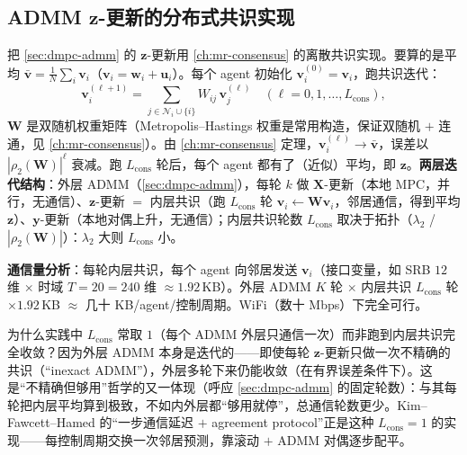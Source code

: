 \subsection{ADMM $\mathbf{z}$-更新的分布式共识实现}
\label{sec:dmpc-z-consensus}

把 \cref{sec:dmpc-admm} 的 $\mathbf{z}$-更新用 \cref{ch:mr-consensus} 的离散共识实现。要算的是平均 $\bar{\mathbf{v}}=\tfrac1N\sum_i\mathbf{v}_i$（$\mathbf{v}_i=\mathbf{w}_i+\mathbf{u}_i$）。每个 agent 初始化 $\mathbf{v}_i^{(0)}=\mathbf{v}_i$，跑共识迭代：
\begin{equation}
  \mathbf{v}_i^{(\ell+1)}=\sum_{j\in\mathcal{N}_i\cup\{i\}}W_{ij}\,\mathbf{v}_j^{(\ell)}\quad(\ell=0,1,\dots,L_{\text{cons}}),
  \label{eq:dmpc-inner-consensus}
\end{equation}
$\mathbf{W}$ 是双随机权重矩阵（Metropolis--Hastings 权重是常用构造，保证双随机 $+$ 连通，见 \cref{ch:mr-consensus}）。由 \cref{ch:mr-consensus} 定理，$\mathbf{v}_i^{(\ell)}\to\bar{\mathbf{v}}$，误差以 $|\rho_2(\mathbf{W})|^\ell$ 衰减。跑 $L_{\text{cons}}$ 轮后，每个 agent 都有了（近似）平均，即 $\mathbf{z}$。\textbf{两层迭代结构}：外层 ADMM（\cref{sec:dmpc-admm}），每轮 $k$ 做 $\mathbf{X}$-更新（本地 MPC，并行，无通信）、$\mathbf{z}$-更新 $=$ 内层共识（跑 $L_{\text{cons}}$ 轮 $\mathbf{v}_i\leftarrow\mathbf{W}\mathbf{v}_i$，邻居通信，得到平均 $\mathbf{z}$）、$\mathbf{y}$-更新（本地对偶上升，无通信）；内层共识轮数 $L_{\text{cons}}$ 取决于拓扑（$\lambda_2$ / $|\rho_2(\mathbf{W})|$）：$\lambda_2$ 大则 $L_{\text{cons}}$ 小。

\textbf{通信量分析}：每轮内层共识，每个 agent 向邻居发送 $\mathbf{v}_i$（接口变量，如 SRB $12$ 维 $\times$ 时域 $T=20=240$ 维 $\approx1.92$\,KB）。外层 ADMM $K$ 轮 $\times$ 内层共识 $L_{\text{cons}}$ 轮 $\times1.92$\,KB $\approx$ 几十 KB/agent/控制周期。WiFi（数十 Mbps）下完全可行。

\begin{insight}\label{ins:dmpc-inexact}
为什么实践中 $L_{\text{cons}}$ 常取 $1$（每个 ADMM 外层只通信一次）而非跑到内层共识完全收敛？因为外层 ADMM 本身是迭代的——即使每轮 $\mathbf{z}$-更新只做一次不精确的共识（“inexact ADMM”），外层多轮下来仍能收敛（在有界误差条件下）。这是“不精确但够用”哲学的又一体现（呼应 \cref{sec:dmpc-admm} 的固定轮数）：与其每轮把内层平均算到极致，不如内外层都“够用就停”，总通信轮数更少。Kim--Fawcett--Hamed\cite{kim2023layered} 的“一步通信延迟 $+$ agreement protocol”正是这种 $L_{\text{cons}}=1$ 的实现——每控制周期交换一次邻居预测，靠滚动 $+$ ADMM 对偶逐步配平。
\end{insight}

